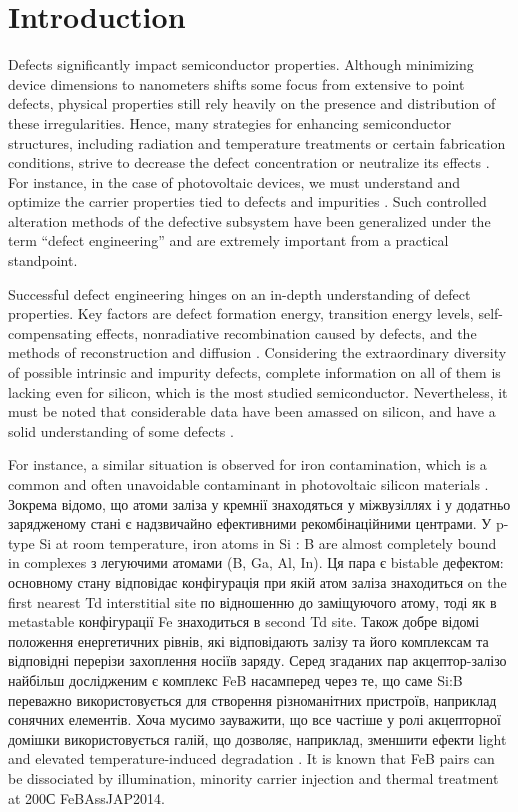 \documentclass{WileyMSP-template}
\begin{document}
\section{Introduction}

Defects significantly impact semiconductor properties.
Although minimizing device dimensions to nanometers shifts some focus from extensive to point defects, 
physical properties still rely heavily on the presence and distribution of these irregularities. 
Hence, many strategies for enhancing semiconductor structures, including radiation and temperature treatments or certain fabrication conditions, strive to decrease the defect concentration or neutralize its effects \cite{Cai2023,Vobecky2021,Frascaroli2021}.
For instance, in the case of photovoltaic devices, we must understand and optimize the carrier properties tied to defects and impurities  \cite{Cai2023}.
Such controlled alteration methods of the defective subsystem have been generalized under the term ``defect engineering'' and are extremely important from a practical standpoint.

Successful defect engineering hinges on an in-depth understanding of defect properties.
Key factors are defect formation energy, transition energy levels, self-compensating effects, nonradiative recombination caused by defects, and the methods of reconstruction and diffusion  \cite{Cai2023}.
Considering the extraordinary diversity of possible intrinsic and impurity defects, complete information on all of them is lacking even for silicon, which is the most studied semiconductor.
Nevertheless, it must be noted that considerable data have been amassed on silicon, and have a solid understanding of some defects \cite{Juhl2018}.


For instance, a similar situation is observed for iron contamination, which is a common and often unavoidable contaminant in photovoltaic silicon materials \cite{Frascaroli2021,Sun2021}.
Зокрема відомо, що атоми заліза у кремнії знаходяться у міжвузіллях і у додатньо зарядженому стані є надзвичайно ефективними рекомбінаційними центрами.
У p-type Si at room temperature, iron atoms in Si : B are almost completely bound in complexes з легуючими атомами (B, Ga, Al, In).
Ця пара є bistable дефектом: основному стану відповідає конфігурація при якій атом заліза знаходиться on the first nearest Td interstitial site 
по відношенню до заміщуючого атому, тоді як в metastable конфігурації Fe  знаходиться в second Td site. 
Також добре відомі положення енергетичних рівнів, які відповідають залізу та його комплексам та відповідні перерізи захоплення носіїв заряду.
Серед згаданих пар акцептор-залізо найбільш дослідженим є комплекс FeB насамперед через те, що саме Si:B переважно використовується для створення різноманітних пристроїв,
наприклад сонячних елементів. 
Хоча мусимо зауважити, що все частіше у ролі акцепторної домішки використовується галій, що дозволяє, наприклад, зменшити ефекти light and elevated temperature-induced degradation \cite{Ning2022}.
It is known that
FeB pairs can be dissociated by illumination, minority carrier injection and thermal treatment at 200С FeBAssJAP2014.
\end{document}
